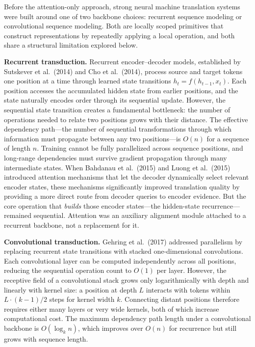 ﻿\documentclass{article}
\begin{document}
Before the attention-only approach, strong neural machine translation systems were built around one of two backbone choices: recurrent sequence modeling or convolutional sequence modeling. Both are locally scoped primitives that construct representations by repeatedly applying a local operation, and both share a structural limitation explored below.

\textbf{Recurrent transduction.} Recurrent encoder--decoder models, established by Sutskever et al.\ (2014) and Cho et al.\ (2014), process source and target tokens one position at a time through learned state transitions $h_t = f(h_{t-1}, x_t)$. Each position accesses the accumulated hidden state from earlier positions, and the state naturally encodes order through its sequential update. However, the sequential state transition creates a fundamental bottleneck: the number of operations needed to relate two positions grows with their distance. The effective dependency path---the number of sequential transformations through which information must propagate between any two positions---is $O(n)$ for a sequence of length $n$. Training cannot be fully parallelized across sequence positions, and long-range dependencies must survive gradient propagation through many intermediate states. When Bahdanau et al.\ (2015) and Luong et al.\ (2015) introduced attention mechanisms that let the decoder dynamically select relevant encoder states, these mechanisms significantly improved translation quality by providing a more direct route from decoder queries to encoder evidence. But the core operation that \emph{builds} those encoder states---the hidden-state recurrence---remained sequential. Attention was an auxiliary alignment module attached to a recurrent backbone, not a replacement for it.

\textbf{Convolutional transduction.} Gehring et al.\ (2017) addressed parallelism by replacing recurrent state transitions with stacked one-dimensional convolutions. Each convolutional layer can be computed independently across all positions, reducing the sequential operation count to $O(1)$ per layer. However, the receptive field of a convolutional stack grows only logarithmically with depth and linearly with kernel size: a position at depth $L$ interacts with tokens within $L\cdot(k-1)/2$ steps for kernel width $k$. Connecting distant positions therefore requires either many layers or very wide kernels, both of which increase computational cost. The maximum dependency path length under a convolutional backbone is $O(\log_k n)$, which improves over $O(n)$ for recurrence but still grows with sequence length.
\end{document}
